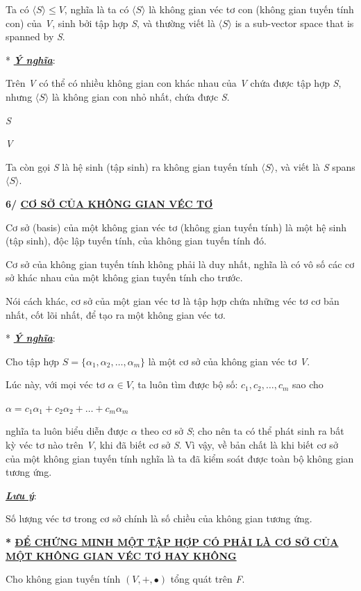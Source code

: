 \documentclass[12pt,a4paper]{article}
\newcommand{\ul}[1]{\uline{#1}}
\begin{document}
Ta có $\langle S \rangle \le V$, nghĩa là ta có
$\langle S \rangle$ là không gian véc tơ
con (không gian tuyến tính con) của \emph{V}, sinh bởi tập hợp \emph{S},
và thường viết là $\langle S \rangle$ is a
sub-vector space that is spanned by \emph{S}.

* \emph{\textbf{\ul{Ý nghĩa}}}:

Trên \emph{V} có thể có nhiều không gian con khác nhau của \emph{V} chứa
được tập hợp \emph{S}, nhưng
$\langle S \rangle$ là không gian con nhỏ
nhất, chứa được \emph{S}.

\emph{S}

\emph{V}

Ta còn gọi \emph{S} là hệ sinh (tập sinh) ra không gian tuyến tính
$\langle S \rangle$, và viết là \emph{S}
spans $\langle S \rangle$.

\textbf{6/ \ul{CƠ SỞ CỦA KHÔNG GIAN VÉC TƠ}}

Cơ sở (basis) của một không gian véc tơ (không gian tuyến tính) là một
hệ sinh (tập sinh), độc lập tuyến tính, của không gian tuyến tính đó.

Cơ sở của không gian tuyến tính không phải là duy nhất, nghĩa là có vô
số các cơ sở khác nhau của một không gian tuyến tính cho trước.

Nói cách khác, cơ sở của một gian véc tơ là tập hợp chứa những véc tơ cơ
bản nhất, cốt lõi nhất, để tạo ra một không gian véc tơ.

* \emph{\textbf{\ul{Ý nghĩa}}}:

Cho tập hợp $S = \{ \alpha_1, \alpha_2, \dots, \alpha_m \}$ là một cơ
sở của không gian véc tơ \emph{V}.

Lúc này, với mọi véc tơ
$\alpha \in V$, ta luôn tìm được bộ
số: $c_1, c_2, \dots, c_m$ sao cho

$\alpha = c_1 \alpha_1 + c_2 \alpha_2 + \dots + c_m \alpha_m$

nghĩa ta luôn biểu diễn được
$\alpha$ theo cơ sở \emph{S};
cho nên ta có thể phát sinh ra bất kỳ véc tơ nào trên \emph{V}, khi đã
biết cơ sở \emph{S}. Vì vậy, về bản chất là khi biết cơ sở của một không
gian tuyến tính nghĩa là ta đã kiểm soát được toàn bộ không gian tương
ứng.

\emph{\textbf{\ul{Lưu ý}}}:

Số lượng véc tơ trong cơ sở chính là số chiều của không gian tương ứng.

\textbf{* \ul{ĐỂ CHỨNG MINH MỘT TẬP HỢP CÓ PHẢI LÀ CƠ SỞ CỦA MỘT KHÔNG
GIAN VÉC TƠ HAY KHÔNG}}

Cho không gian tuyến tính
$(V, +, \bullet)$ tổng quát trên
\emph{F}.
\end{document}
